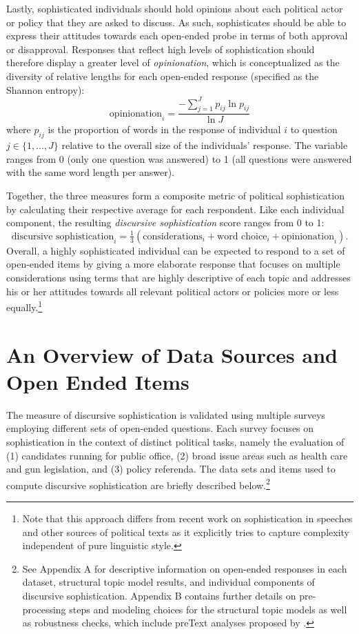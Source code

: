Lastly, sophisticated individuals should hold opinions about each political actor or policy that they are asked to discuss. As such, sophisticates should be able to express their attitudes towards each open-ended probe in terms of both approval or disapproval. Responses that reflect high levels of sophistication should therefore display a greater level of \textit{opinionation}, which is conceptualized as the diversity of relative lengths for each open-ended response (specified as the Shannon entropy):
\begin{equation}
\text{opinionation}_i = \dfrac{-\sum_{j=1}^J p_{ij} \ln p_{ij}}{\ln J}
\end{equation}
where $p_{ij}$ is the proportion of words in the response of individual $i$ to question $j\in \{1,...,J\}$ relative to the overall size of the individuals' response. The variable ranges from 0 (only one question was answered) to 1 (all questions were answered with the same word length per answer).

Together, the three measures form a composite metric of political sophistication by calculating their respective average for each respondent. Like each individual component, the resulting \textit{discursive sophistication} score ranges from 0 to 1:
\begin{equation}
\text{discursive sophistication}_i = \tfrac{1}{3}(\text{considerations}_i + \text{word choice}_i + \text{opinionation}_i).
\end{equation}
Overall, a highly sophisticated individual can be expected to respond to a set of open-ended items by giving a more elaborate response that focuses on multiple considerations using terms that are highly descriptive of each topic and addresses his or her attitudes towards all relevant political actors or policies more or less equally.\footnote{Note that this approach differs from recent work on sophistication in speeches and other sources of political texts \citep[e.g.,][]{spirling2016democratization,benoit2017measuring} as it explicitly tries to capture complexity independent of pure linguistic style.}


\section{An Overview of Data Sources and Open Ended Items}

The measure of discursive sophistication is validated using multiple surveys employing different sets of open-ended questions. Each survey focuses on sophistication in the context of distinct political tasks, namely the evaluation of (1) candidates running for public office, (2) broad issue areas such as health care and gun legislation, and (3) policy referenda. The data sets and items used to compute discursive sophistication are briefly described below.\footnote{See Appendix A for descriptive information on open-ended responses in each dataset, structural topic model results, and individual components of discursive sophistication. Appendix B contains further details on pre-processing steps and modeling choices for the structural topic models as well as robustness checks, which include preText analyses proposed by \citet{denny2018text}.}


